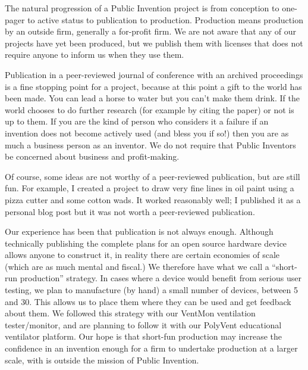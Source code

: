 \documentclass[
	fontsize=10pt, %
	twoside=false, %
	secnumdepth=1, %
]{kaobook}
\begin{document}
The natural progression of a Public Invention project is
from conception to one-pager to active status to publication
to production. Production means production by an outside firm, generally
a for-profit firm. We are not aware that any of our projects
have yet been produced, but we publish them with licenses that
does not require anyone to inform us when they use them.

Publication in a peer-reviewed journal of conference with an
archived proceedings is a fine stopping point for a project,
because at this point a gift to the world has been made.
You can lead a horse to water but you can't make them drink.
If the world chooses to do further research (for example by citing
the paper) or not is up to them. If you are the kind of
person who considers it a failure if an invention does not
become actively used (and bless you if so!) then you are
as much a business person as an inventor. We do not require
that Public Inventors be concerned about business and profit-making.

Of course, some ideas are not worthy of a peer-reviewed publication,
but are still fun. For example, I created a project to draw very fine
lines in oil paint using a pizza cutter and some cotton wads.
It worked reasonably well; I published it as a personal blog post
but it was not worth a peer-reviewed publication.

Our experience has been that publication is not always enough.
Although technically publishing the complete plans for an open source
hardware device allows anyone to construct it, in reality there
are certain economies of scale (which are as much mental and fiscal.)
We therefore have what we call a ``short-run production'' strategy.
In cases where a device would benefit from serious user testing,
we plan to manufacture (by hand) a small number of devices, between
5 and 30. This allows us to place them where they can be used and
get feedback about them. We followed this strategy with our VentMon
ventilation tester/monitor, and are planning to follow it with our
PolyVent educational ventilator platform.
Our hope is that short-fun production may increase the confidence
in an invention enough for a firm to undertake production at a larger scale,
with is outside the mission of Public Invention.
\end{document}
